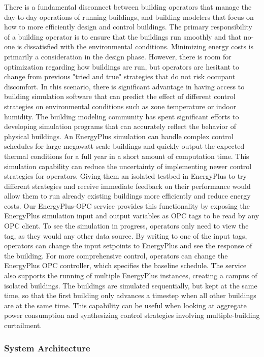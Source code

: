 There is a fundamental disconnect between building operators that manage the day-to-day operations of running buildings, and building modelers that focus on how to more efficiently design and control buildings. The primary responsibility of a building operator is to ensure that the buildings run smoothly and that no-one is dissatisfied with the environmental conditions. Minimizing energy costs is primarily a consideration in the design phase. However, there is room for optimization regarding how buildings are run, but operators are hesitant to change from previous "tried and true" strategies that do not risk occupant discomfort. In this scenario, there is significant advantage in having access to building simulation software that can predict the effect of different control strategies on environmental conditions such as zone temperature or indoor humidity.
The building modeling community has spent significant efforts to developing simulation programs that can accurately reflect the behavior of physical buildings. An EnergyPlus simulation can handle complex control schedules for large megawatt scale buildings and quickly output the expected thermal conditions for a full year in a short amount of computation time. This simulation capability can reduce the uncertainty of implementing newer control strategies for operators. Giving them an isolated testbed in EnergyPlus to try different strategies and receive immediate feedback on their performance would allow them to run already existing buildings more efficiently and reduce energy costs.
Our EnergyPlus-OPC service provides this functionality by exposing the EnergyPlus simulation input and output variables as OPC tags to be read by any OPC client. To see the simulation in progress, operators only need to view the tag, as they would any other data source. By writing to one of the input tags, operators can change the input setpoints to EnergyPlus and see the response of the building. For more comprehensive control, operators can change the EnergyPlus OPC controller, which specifies the baseline schedule.
The service also supports the running of multiple EnergyPlus instances, creating a campus of isolated buildings. The buildings are simulated sequentially, but kept at the same time, so that the first building only advances a timestep when all other buildings are at the same time. This capability can be useful when looking at aggregate power consumption and synthesizing control strategies involving multiple-building curtailment.
\subsubsection{System Architecture}

